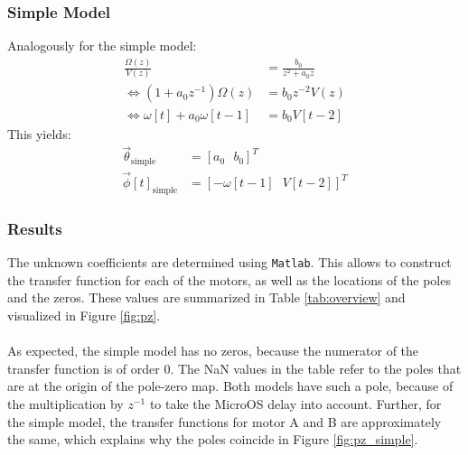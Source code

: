 \documentclass[a4paper,kul]{kulakarticle} %
\begin{document}
\subsubsection*{Simple Model}
Analogously for the simple model:
\begin{equation}
\begin{split}
\frac{\Omega(z)}{V(z)} &= \frac{b_0}{z^2 + a_0 z} \\
\iff (1 + a_0 z^{-1})\Omega(z) &= b_0 z^{-2} V(z) \\	
\iff \omega[t] + a_0 \omega[t-1] &= b_0 V[t-2]
\end{split}
\end{equation}
This yields: 
\begin{equation}
\begin{split}
\vec{\theta}_{\text{simple}} &= \left[a_0\text{ }b_0\right]^T \\
\vec{\phi}[t]_{\text{simple}} &= \left[-\omega[t-1]\text{ }V[t-2]\right]^T
\end{split}
\end{equation}

\subsubsection{Results}
\noindent The unknown coefficients are determined using \texttt{Matlab}. This allows to construct the transfer function for each of the motors, as well as the locations of the poles and the zeros. These values are summarized in Table \ref{tab:overview} and visualized in Figure \ref{fig:pz}.
\\\\
As expected, the simple model has no zeros, because the numerator of the transfer function is of order 0. The NaN values in the table refer to the poles that are at the origin of the pole-zero map. Both models have such a pole, because of the multiplication by $z^{-1}$ to take the MicroOS delay into account. Further, for the simple model, the transfer functions for motor A and B are approximately the same, which explains why the poles coincide in Figure \ref{fig:pz_simple}.
\end{document}
